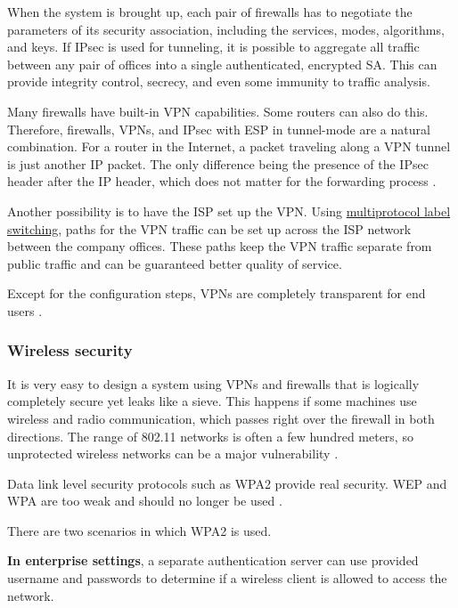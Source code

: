 When the system is brought up, each pair of firewalls has to negotiate the parameters of its security association, including the services, modes, algorithms, and keys. If IPsec is used for tunneling, it is possible to aggregate all traffic between any pair of offices into a single authenticated, encrypted SA. This can provide integrity control, secrecy, and even some immunity to traffic analysis.

Many firewalls have built-in VPN capabilities.
Some routers can also do this. Therefore, firewalls, VPNs, and IPsec with ESP in tunnel-mode are a natural combination.
For a router in the Internet, a packet traveling along a VPN tunnel is just another IP packet.
The only difference being the presence of the IPsec header after the IP header, which does not matter for the forwarding process \cite[p.~822]{computer-networks-tanenbaum-2012}.

Another possibility is to have the ISP set up the VPN. Using \href{https://en.wikipedia.org/wiki/Multiprotocol_Label_Switching}{multiprotocol label switching}, paths for the VPN traffic can be set up across the ISP network between the company offices. These paths keep the VPN traffic separate from public traffic and can be guaranteed better quality of service.

Except for the configuration steps, VPNs are completely transparent for end users \cite[p.~822]{computer-networks-tanenbaum-2012}.

\subsubsection{Wireless security}

It is very easy to design a system using VPNs and firewalls that is logically completely secure yet leaks like a sieve.
This happens if some machines use wireless and radio communication, which passes right over the firewall in both directions.
The range of 802.11 networks is often a few hundred meters, so unprotected wireless networks can be a major vulnerability \cite[p.~823]{computer-networks-tanenbaum-2012}.

Data link level security protocols such as WPA2 provide real security.
WEP and WPA are too weak and should no longer be used \cite[p.~824]{computer-networks-tanenbaum-2012}.

There are two scenarios in which WPA2 is used.

\textbf{In enterprise settings}, a separate authentication server can use provided username and passwords to determine if a wireless client is allowed to access the network.

